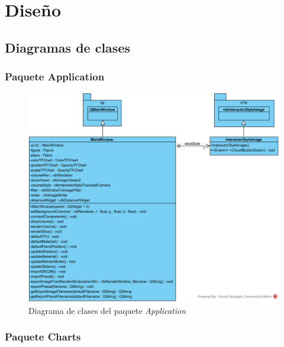 \chapter{Diseño}

\section{Diagramas de clases}

\subsection{Paquete Application}

\begin{figure}[H]
	\centering
	\includegraphics[width=12.5cm]{imagenes/diagramas/application}
	\caption{Diagrama de clases del paquete \textit{Application}}
	\label{fig:diagrama_clases_application}
\end{figure}

\subsection{Paquete Charts}


